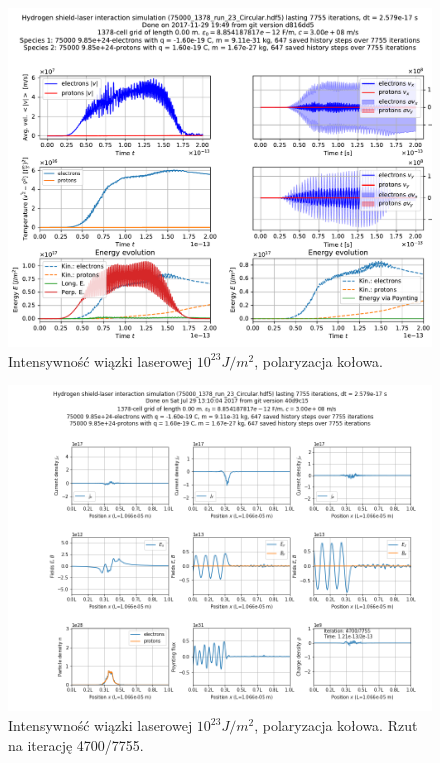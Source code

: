 \begin{figure}[h!]
  \includegraphics[width=\textwidth]{Images/75000_1378_run_23_Circular}
  \caption{Intensywność wiązki laserowej $10^{23} J/m^2$, polaryzacja kołowa.\label{fig:laser-23-Circular}}
\end{figure}

\begin{figure}[h!]
  \includegraphics[width=\textwidth]{Images/75000_1378_run_23_Circular_004700}
  \caption{Intensywność wiązki laserowej $10^{23} J/m^2$, polaryzacja kołowa. Rzut na iterację 4700/7755.\label{fig:laser-23-Circular-snapshot}}
\end{figure}




